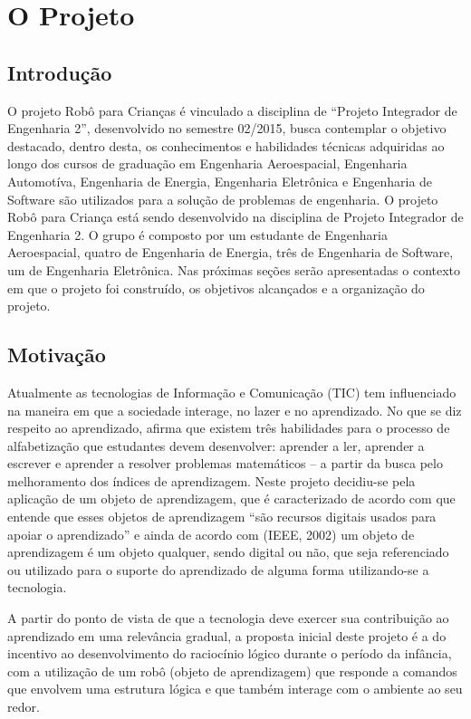 \chapter[O Projeto]{O Projeto}

\section{Introdução}
O projeto Robô para Crianças é vinculado a disciplina de “Projeto Integrador de Engenharia 2”, desenvolvido
no semestre 02/2015, busca contemplar o objetivo destacado, dentro desta, os conhecimentos e habilidades
técnicas adquiridas ao longo dos cursos de graduação em Engenharia Aeroespacial,  Engenharia Automotíva,
Engenharia de Energia, Engenharia Eletrônica e Engenharia de Software são utilizados para a solução de
problemas de engenharia. O projeto Robô para Criança está sendo desenvolvido na disciplina de Projeto Integrador de
Engenharia 2. O grupo é composto por um estudante de Engenharia Aeroespacial, quatro de
Engenharia de Energia, três de Engenharia de Software, um de Engenharia Eletrônica. Nas próximas seções serão
apresentadas o contexto em que o projeto foi construído, os objetivos alcançados e a organização do projeto.


\section{Motivação}
Atualmente as tecnologias de Informação e Comunicação (TIC) tem influenciado na maneira em que a sociedade
interage, no lazer e no aprendizado. No que se diz respeito ao aprendizado,  afirma que
existem três habilidades para o processo de alfabetização que estudantes devem desenvolver: aprender a ler, aprender
a escrever e aprender a resolver problemas matemáticos – a partir da busca pelo melhoramento dos índices de
aprendizagem. Neste projeto decidiu-se pela aplicação de um objeto de aprendizagem, que é caracterizado de
acordo com  que entende que esses objetos de aprendizagem “são recursos digitais usados para
apoiar o aprendizado” e ainda de acordo com (IEEE, 2002) um objeto de aprendizagem é um objeto qualquer, sendo
digital ou não, que seja referenciado ou utilizado para o suporte do aprendizado de alguma forma utilizando-se
a tecnologia.

A partir do ponto de vista de que a tecnologia deve exercer sua contribuição ao aprendizado em uma relevância
gradual, a proposta inicial deste projeto é a do incentivo ao desenvolvimento do raciocínio lógico durante o período
da infância, com a utilização de um robô (objeto de aprendizagem) que responde a comandos que envolvem uma
estrutura lógica e que também interage com o ambiente ao seu redor.

